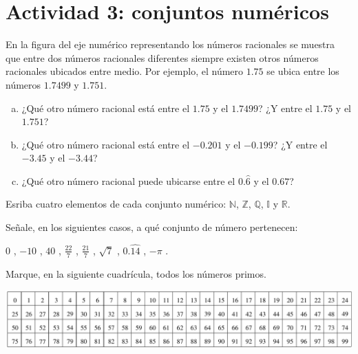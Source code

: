 \documentclass[11pt]{article}
\begin{document}
\section*{Actividad 3: conjuntos numéricos}

\begin{exercise}
En la figura del eje numérico representando los números racionales se muestra que entre dos números racionales diferentes siempre existen otros números racionales ubicados entre medio. Por ejemplo, el número $1.75$ se ubica entre los números $1.7499$ y $1.751$.
\begin{enumerate}[a)]
    \item ¿Qué otro número racional está entre el $1.75$ y el $1.7499$? ¿Y entre el $1.75$ y el $1.751$?
    \item ¿Qué otro número racional está entre el $-0.201$ y el $-0.199$? ¿Y entre el $-3.45$ y el $-3.44$?
    \item ¿Qué otro número racional puede ubicarse entre el $0.\hat{6}$ y el $0.67$?
\end{enumerate}
\end{exercise}

\begin{exercise}
Esriba cuatro elementos de cada conjunto numérico: $\mathbb{N}$, $\mathbb{Z}$, $\mathbb{Q}$, $\mathbb{I}$ y $\mathbb{R}$. 
\end{exercise}

\begin{exercise}
Señale, en los siguientes casos, a qué conjunto de número pertenecen:

$0$ \blank{}, $-10$ \blank{}, $40$ \blank{}, $\frac{22}{7}$ \blank{}, 
$\frac{21}{7}$ \blank{}, $\sqrt{7}$ \blank{}, $0.\widehat{14}$ \blank{}, 
$-\pi$ \blank{}.
\end{exercise}

\begin{exercise}
Marque, en la siguiente cuadrícula, todos los números primos.
\begin{center}
    \includegraphics[width=1.0\textwidth]{figs/primos.png}
\end{center}
\end{exercise}
\end{document}
